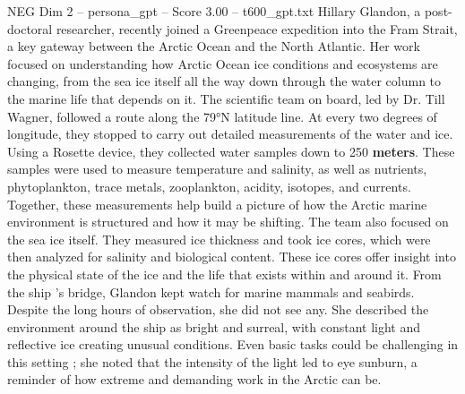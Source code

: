 \begin{textsample}{NEG Dim 2 – persona\_gpt – Score 3.00 – t600\_gpt.txt}  \label{ex:f2_neg_044}
Hillary Glandon, a post-doctoral researcher, recently joined a Greenpeace expedition into the Fram Strait, a key gateway between the Arctic Ocean and the North Atlantic.
Her work focused on understanding how Arctic Ocean ice conditions and ecosystems are changing, from the sea ice itself all the way down through the water column to the marine life that depends on it.
The scientific team on board, led by Dr.
Till Wagner, followed a route along the 79°N latitude line.
At every two degrees of longitude, they stopped to carry out detailed measurements of the water and ice.
Using a Rosette device, they collected water samples down to 250 \textbf{meters}.
These samples were used to measure temperature and salinity, as well as nutrients, phytoplankton, trace metals, zooplankton, acidity, isotopes, and currents.
Together, these measurements help build a picture of how the Arctic marine environment is structured and how it may be shifting.
The team also focused on the sea ice itself.
They measured ice thickness and took ice cores, which were then analyzed for salinity and biological content.
These ice cores offer insight into the physical state of the ice and the life that exists within and around it.
From the ship ’s bridge, Glandon kept watch for marine mammals and seabirds.
Despite the long hours of observation, she did not see any.
She described the environment around the ship as bright and surreal, with constant light and reflective ice creating unusual conditions.
Even basic tasks could be challenging in this setting ; she noted that the intensity of the light led to eye sunburn, a reminder of how extreme and demanding work in the Arctic can be.

\end{textsample}

